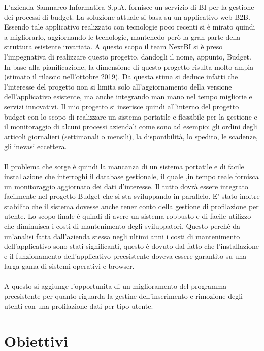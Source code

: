 L'azienda Sanmarco Informatica S.p.A. fornisce un servizio di BI per la gestione dei processi di budget. La soluzione attuale si basa su un applicativo web B2B. Essendo tale applicativo realizzato con tecnologie poco recenti si è mirato quindi a migliorarlo, aggiornando le tecnologie, mantenedo però la gran parte della struttura esistente invariata.  A questo scopo il team NextBI si è preso l'impegnativa di realizzare questo progetto, dandogli il nome, appunto, Budget. In base alla pianificazione, la dimensione di questo progetto risulta molto ampia (stimato il rilascio nell'ottobre 2019). Da questa stima si deduce infatti che l'interesse del progetto non si limita solo all'aggiornamento della versione dell'applicativo esistente, ma anche integrando man mano nel tempo migliorie e servizi innovativi. Il mio progetto si inserisce quindi all'interno del progetto budget con lo scopo di realizzare un sistema portatile e flessibile per la gestione e il monitoraggio di alcuni processi aziendali come sono ad esempio: gli ordini degli articoli giornalieri (settimanali o mensili), la disponibilità, lo spedito, le scadenze, gli inevasi eccettera. 
\\ \\
Il problema che sorge è quindi la mancanza di un sistema portatile e di facile installazione che interroghi il database gestionale, il quale ,in tempo reale fornisca un monitoraggio aggiornato dei dati d'interesse. Il tutto dovrà essere integrato facilmente nel progetto Budget che si sta sviluppando in parallelo. E' stato inoltre stabilito che il sistema dovesse anche tener conto della gestione di profilazione per utente. Lo scopo finale è quindi di avere un sistema robbusto e di facile utilizzo che diminuisca i costi di mantenimento degli sviluppatori. Questo perchè da un'analisi fatta dall'azienda stessa negli ultimi anni i costi di mantenimento dell'applicativo sono  stati significanti, questo è dovuto dal fatto che l'installazione e il funzionamento dell'applicativo preesistente doveva essere garantito su una larga gama di sistemi operativi e browser.
\\ \\
A questo si aggiunge l'opportunita di un miglioramento del programma preesistente per quanto riguarda  la gestine dell'inserimento e rimozione degli utenti con una profilazione dati per tipo utente.





\section{Obiettivi}

